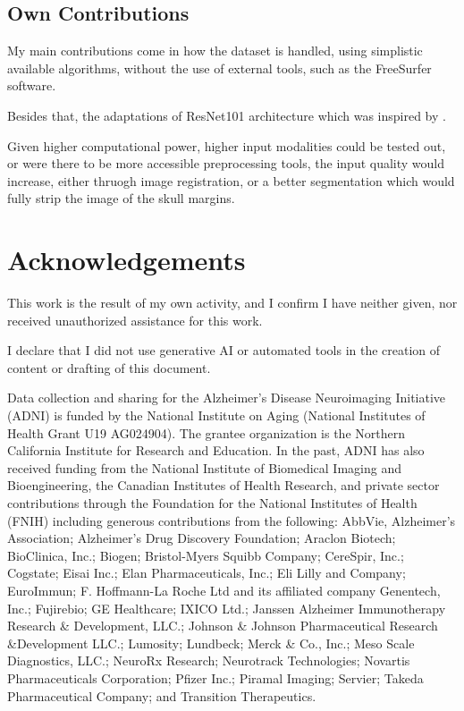 \documentclass[a4paper, 12pt]{article}
\begin{document}
\newpage
\subsection{Own Contributions}
My main contributions come in how the dataset is handled, using simplistic available algorithms, without the use of external tools, such as
the FreeSurfer software.

Besides that, the adaptations of ResNet101 architecture which was inspired by \cite{bae2020}.

Given higher computational power, higher input modalities could be tested out, or were there to be more accessible preprocessing tools,
the input quality would increase, either thruogh image registration, or a better segmentation which would fully strip the image of the skull
margins.

\newpage
\section{Acknowledgements}

This work is the result of my own activity, and I confirm I have neither given, nor received unauthorized assistance for this work.

I declare that I did not use generative AI or automated tools in the creation of content or drafting of this document.


Data collection and sharing for the Alzheimer's Disease Neuroimaging Initiative (ADNI) is funded by the National
Institute on Aging (National Institutes of Health Grant U19 AG024904). The grantee organization is the Northern
California Institute for Research and Education. In the past, ADNI has also received funding from the National
Institute of Biomedical Imaging and Bioengineering, the Canadian Institutes of Health Research, and private
sector contributions through the Foundation for the National Institutes of Health (FNIH) including generous
contributions from the following: AbbVie, Alzheimer’s Association; Alzheimer’s Drug Discovery Foundation;
Araclon Biotech; BioClinica, Inc.; Biogen; Bristol-Myers Squibb Company; CereSpir, Inc.; Cogstate; Eisai Inc.;
Elan Pharmaceuticals, Inc.; Eli Lilly and Company; EuroImmun; F. Hoffmann-La Roche Ltd and its affiliated
company Genentech, Inc.; Fujirebio; GE Healthcare; IXICO Ltd.; Janssen Alzheimer Immunotherapy Research \&
Development, LLC.; Johnson \& Johnson Pharmaceutical Research \&Development LLC.; Lumosity; Lundbeck;
Merck \& Co., Inc.; Meso Scale Diagnostics, LLC.; NeuroRx Research; Neurotrack Technologies; Novartis
Pharmaceuticals Corporation; Pfizer Inc.; Piramal Imaging; Servier; Takeda Pharmaceutical Company; and
Transition Therapeutics.
\newpage



\end{document}
